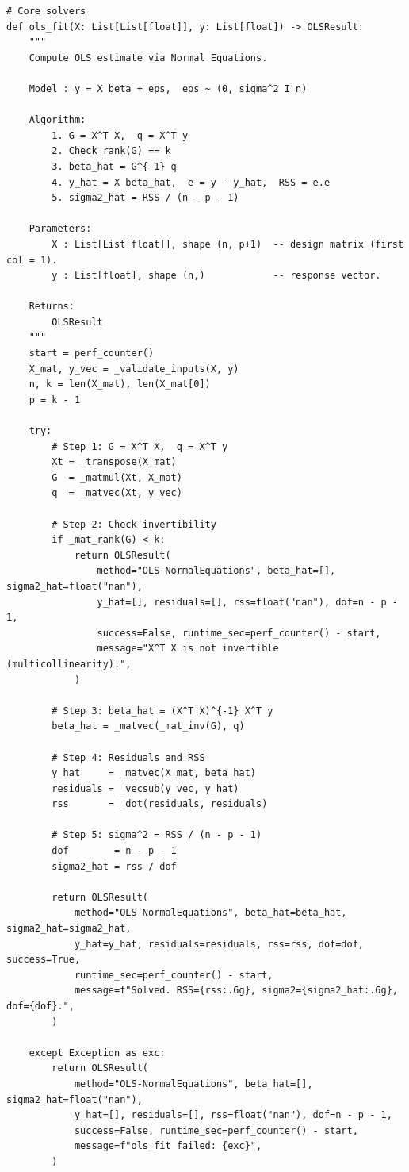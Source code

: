 \begin{lstlisting}[caption={Ham \texttt{ols\_fit}}, label={lst:ols_fit}]
# Core solvers
def ols_fit(X: List[List[float]], y: List[float]) -> OLSResult:
    """
    Compute OLS estimate via Normal Equations.

    Model : y = X beta + eps,  eps ~ (0, sigma^2 I_n)

    Algorithm:
        1. G = X^T X,  q = X^T y
        2. Check rank(G) == k
        3. beta_hat = G^{-1} q
        4. y_hat = X beta_hat,  e = y - y_hat,  RSS = e.e
        5. sigma2_hat = RSS / (n - p - 1)

    Parameters:
        X : List[List[float]], shape (n, p+1)  -- design matrix (first col = 1).
        y : List[float], shape (n,)            -- response vector.

    Returns:
        OLSResult
    """
    start = perf_counter()
    X_mat, y_vec = _validate_inputs(X, y)
    n, k = len(X_mat), len(X_mat[0])
    p = k - 1

    try:
        # Step 1: G = X^T X,  q = X^T y
        Xt = _transpose(X_mat)
        G  = _matmul(Xt, X_mat)
        q  = _matvec(Xt, y_vec)

        # Step 2: Check invertibility
        if _mat_rank(G) < k:
            return OLSResult(
                method="OLS-NormalEquations", beta_hat=[], sigma2_hat=float("nan"),
                y_hat=[], residuals=[], rss=float("nan"), dof=n - p - 1,
                success=False, runtime_sec=perf_counter() - start,
                message="X^T X is not invertible (multicollinearity).",
            )

        # Step 3: beta_hat = (X^T X)^{-1} X^T y
        beta_hat = _matvec(_mat_inv(G), q)

        # Step 4: Residuals and RSS
        y_hat     = _matvec(X_mat, beta_hat)
        residuals = _vecsub(y_vec, y_hat)
        rss       = _dot(residuals, residuals)

        # Step 5: sigma^2 = RSS / (n - p - 1)
        dof        = n - p - 1
        sigma2_hat = rss / dof

        return OLSResult(
            method="OLS-NormalEquations", beta_hat=beta_hat, sigma2_hat=sigma2_hat,
            y_hat=y_hat, residuals=residuals, rss=rss, dof=dof, success=True,
            runtime_sec=perf_counter() - start,
            message=f"Solved. RSS={rss:.6g}, sigma2={sigma2_hat:.6g}, dof={dof}.",
        )

    except Exception as exc:
        return OLSResult(
            method="OLS-NormalEquations", beta_hat=[], sigma2_hat=float("nan"),
            y_hat=[], residuals=[], rss=float("nan"), dof=n - p - 1,
            success=False, runtime_sec=perf_counter() - start,
            message=f"ols_fit failed: {exc}",
        )
\end{lstlisting}

